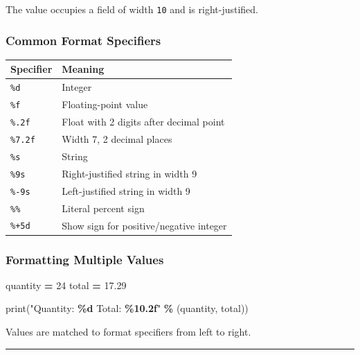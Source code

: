 \documentclass[
]{article}
\newenvironment{Shaded}{\begin{snugshade}}{\end{snugshade}}
\newcommand{\BuiltInTok}[1]{#1}
\newcommand{\DecValTok}[1]{\textcolor[rgb]{0.00,0.00,0.81}{#1}}
\newcommand{\FloatTok}[1]{\textcolor[rgb]{0.00,0.00,0.81}{#1}}
\newcommand{\NormalTok}[1]{#1}
\newcommand{\OperatorTok}[1]{\textcolor[rgb]{0.81,0.36,0.00}{\textbf{#1}}}
\newcommand{\SpecialCharTok}[1]{\textcolor[rgb]{0.81,0.36,0.00}{\textbf{#1}}}
\newcommand{\StringTok}[1]{\textcolor[rgb]{0.31,0.60,0.02}{#1}}
\newcounter{none} %
\begin{document}
The value occupies a field of width \texttt{10} and is right-justified.

\subsubsection{Common Format Specifiers}\label{common-format-specifiers}

{\def\LTcaptype{none} %
\begin{longtable}[]{@{}ll@{}}
\toprule\noalign{}
Specifier & Meaning \\
\midrule\noalign{}
\endhead
\bottomrule\noalign{}
\endlastfoot
\texttt{\%d} & Integer \\
\texttt{\%f} & Floating-point value \\
\texttt{\%.2f} & Float with 2 digits after decimal point \\
\texttt{\%7.2f} & Width 7, 2 decimal places \\
\texttt{\%s} & String \\
\texttt{\%9s} & Right-justified string in width 9 \\
\texttt{\%-9s} & Left-justified string in width 9 \\
\texttt{\%\%} & Literal percent sign \\
\texttt{\%+5d} & Show sign for positive/negative integer \\
\end{longtable}
}

\subsubsection{Formatting Multiple
Values}\label{formatting-multiple-values}

\begin{Shaded}
\begin{Highlighting}[]
\NormalTok{quantity }\OperatorTok{=} \DecValTok{24}
\NormalTok{total }\OperatorTok{=} \FloatTok{17.29}

\BuiltInTok{print}\NormalTok{(}\StringTok{"Quantity: }\SpecialCharTok{\%d}\StringTok{ Total: }\SpecialCharTok{\%10.2f}\StringTok{"} \OperatorTok{\%}\NormalTok{ (quantity, total))}
\end{Highlighting}
\end{Shaded}

Values are matched to format specifiers from left to right.

\begin{center}\rule{0.5\linewidth}{0.5pt}\end{center}
\end{document}

